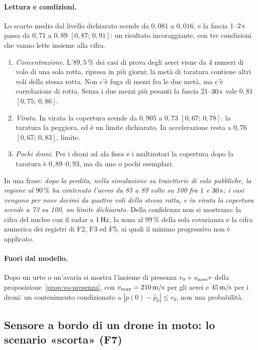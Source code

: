 \paragraph{Lettura e condizioni.} Lo scarto medio dal livello dichiarato scende da $0{,}081$ a $0{,}016$, e la fascia 1--$2\,\mathrm{s}$ passa da $0{,}71$ a $0{,}89$ $[0{,}87;\,0{,}91]$: un risultato incoraggiante, con tre condizioni che vanno lette insieme alla cifra.
\begin{enumerate}[label=\arabic*.]
\item \emph{Concentrazione.} L'$89{,}5\,\%$ dei casi di prova degli aerei viene da 4 numeri di volo di una sola rotta, ripresa in più giorni; la metà di taratura contiene altri voli della stessa rotta. Non c'è fuga di mezzi fra le due metà, ma c'è correlazione di rotta. Senza i due mezzi più pesanti la fascia 21--$30\,\mathrm{s}$ vale $0{,}81$ $[0{,}75;\,0{,}86]$.
\item \emph{Virata.} In virata la copertura scende da $0{,}905$ a $0{,}73$ $[0{,}67;\,0{,}78]$: la taratura la peggiora, ed è un limite dichiarato. In accelerazione resta a $0{,}76$ $[0{,}67;\,0{,}83]$, limite.
\item \emph{Pochi droni.} Per i droni ad ala fissa e i multirotori la copertura dopo la taratura è $0{,}89$--$0{,}93$, ma da uno o pochi esemplari.
\end{enumerate}
In una frase: \emph{dopo la perdita, nella simulazione su traiettorie di volo pubbliche, la regione al $90\,\%$ ha contenuto l'aereo da 85 a 89 volte su 100 fra $1$ e $30\,\mathrm{s}$; i casi vengono per nove decimi da quattro voli della stessa rotta, e in virata la copertura scende a 73 su 100, un limite dichiarato.} Della confidenza non si mostrano: la cifra del nucleo con il radar a $1\,\mathrm{Hz}$, la zona al $99\,\%$ della sola covarianza e la cifra numerica dei registri di F2, F3 ed F5, ai quali il minimo progressivo non è applicato.

\paragraph{Fuori dal modello.} Dopo un urto o un'avaria si mostra l'insieme di presenza $r_0+v_{\max}\tau$ della proposizione~\ref{prop:vo-presenza}, con $v_{\max}=210\,\mathrm{m/s}$ per gli aerei e $45\,\mathrm{m/s}$ per i droni: un contenimento condizionato a $|p(0)-\hat p_0|\le r_0$, non una probabilità.

\subsection{Sensore a bordo di un drone in moto: lo scenario «scorta» (F7)}\label{sec:vo-scorta}

